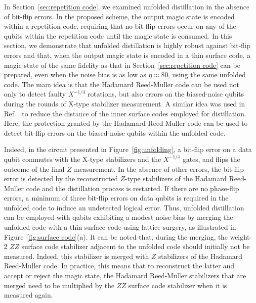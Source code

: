 \documentclass[%
 reprint,
superscriptaddress,
 amsmath,amssymb,
 aps,
]{revtex4-2}
\begin{document}
In Section~\ref{sec:repetition code}, we examined unfolded distillation in the absence of bit-flip errors. In the proposed scheme, the output magic state is encoded within a repetition code, requiring that no bit-flip errors occur on any of the qubits within the repetition code until the magic state is consumed. In this section, we demonstrate that unfolded distillation is highly robust against bit-flip errors and that, when the output magic state is encoded in a thin surface code, a magic state of the same fidelity as that in Section~\ref{sec:repetition code} can be prepared, even when the noise bias is as low as $\eta \approx 80$, using the same unfolded code. The main idea is that the Hadamard Reed-Muller code can be used not only to detect faulty $X^{-1/4}$ rotations, but also errors on the biased-noise qubits during the rounds of X-type stabilizer measurement. A similar idea was used in Ref.~\cite{litinski2019magic} to reduce the distance of the inner surface codes employed for distillation. Here, the protection granted by the Hadamard Reed-Muller code can be used to detect bit-flip errors on the biased-noise qubits within the unfolded code.

Indeed, in the circuit presented in Figure~\ref{fig:unfolding}, a bit-flip error on a data qubit commutes with the X-type stabilizers and the $X^{-1/4}$ gates, and flips the outcome of the final $Z$ measurement. In the absence of other errors, the bit-flip error is detected by the reconstructed $Z$-type stabilizers of the Hadamard Reed-Muller code and the distillation process is restarted. If there are no phase-flip errors, a minimum of three bit-flip errors on data qubits is required in the unfolded code to induce an undetected logical error. Thus, unfolded distillation can be employed with qubits exhibiting a modest noise bias by merging the unfolded code with a thin surface code using lattice surgery, as illustrated in Figure~\ref{fig:surface code}(a). It can be noted that, during the merging, the weight-2 $ZZ$ surface code stabilizer adjacent to the unfolded code should initially not be measured. Indeed, this stabilizer is merged with $Z$ stabilizers of the Hadamard Reed-Muller code. In practice, this means that to reconstruct the latter and accept or reject the magic state, the Hadamard Reed-Muller stabilizers that are merged need to be multiplied by the $ZZ$ surface code stabilizer when it is measured again.
\end{document}
